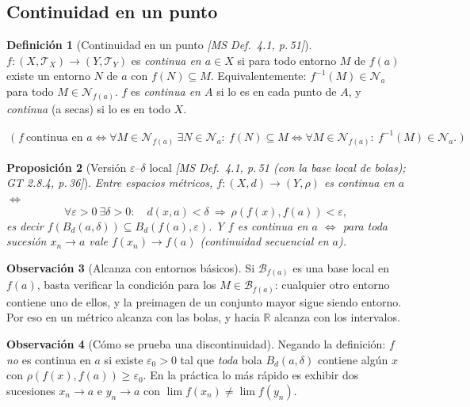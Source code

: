 \documentclass[11pt,a4paper]{article}
\newcommand{\lgc}[1]{\par\vspace{-3pt}\begin{gather*}\big(\;#1\;\big)\end{gather*}\vspace{-6pt}}
\theoremstyle{definition}
\newtheorem{definicion}{Definición}[section]
\newtheorem{observacion}[definicion]{Observación}
\theoremstyle{plain}
\newtheorem{proposicion}[definicion]{Proposición}
\newcommand{\fnt}[1]{{\normalfont\small\itshape\color{gray!150!black}[#1]}}
\newcommand{\R}{\mathbb{R}}
\newcommand{\Bola}[2]{B_d(#1,#2)}
\newcommand{\tp}{\mathcal{T}}
\begin{document}
\subsection{Continuidad en un punto}\label{sec:contpt}

\begin{definicion}[Continuidad en un punto \fnt{MS Def.\ 4.1, p.\,51}]
$f:(X,\tp_X)\to(Y,\tp_Y)$ es \emph{continua en $a\in X$} si para todo entorno $M$ de $f(a)$ existe un entorno $N$ de $a$ con $f(N)\subseteq M$. Equivalentemente: $f^{-1}(M)\in\mathcal N_a$ para todo $M\in\mathcal N_{f(a)}$. $f$ es \emph{continua en $A$} si lo es en cada punto de $A$, y \emph{continua} (a secas) si lo es en todo $X$.
\lgc{f\ \text{continua en } a\iff \forall M\in\mathcal N_{f(a)}\ \exists N\in\mathcal N_a:\ f(N)\subseteq M
\iff \forall M\in\mathcal N_{f(a)}:\ f^{-1}(M)\in\mathcal N_a.}
\end{definicion}

\begin{proposicion}[Versión $\varepsilon$--$\delta$ local \fnt{MS Def.\ 4.1, p.\,51 (con la base local de bolas); GT 2.8.4, p.\,36}]
Entre espacios métricos, $f:(X,d)\to(Y,\rho)$ es continua en $a$ $\iff$
\[
\forall \varepsilon>0\ \exists \delta>0:\quad d(x,a)<\delta \ \Longrightarrow\ \rho(f(x),f(a))<\varepsilon,
\]
es decir $f(\Bola{a}{\delta})\subseteq \Bola{f(a)}{\varepsilon}$. Y $f$ es continua en $a$ $\iff$ para toda sucesión $x_n\to a$ vale $f(x_n)\to f(a)$ (continuidad secuencial \emph{en $a$}).
\end{proposicion}

\begin{observacion}[Alcanza con entornos básicos]
Si $\mathcal B_{f(a)}$ es una base local en $f(a)$, basta verificar la condición para los $M\in\mathcal B_{f(a)}$: cualquier otro entorno contiene uno de ellos, y la preimagen de un conjunto mayor sigue siendo entorno. Por eso en un métrico alcanza con las bolas, y hacia $\R$ alcanza con los intervalos.
\end{observacion}

\begin{observacion}[Cómo se prueba una discontinuidad]
Negando la definición: $f$ \emph{no} es continua en $a$ si existe $\varepsilon_0>0$ tal que \emph{toda} bola $\Bola{a}{\delta}$ contiene algún $x$ con $\rho(f(x),f(a))\ge\varepsilon_0$. En la práctica lo más rápido es exhibir dos sucesiones $x_n\to a$ e $y_n\to a$ con $\lim f(x_n)\ne \lim f(y_n)$.
\end{observacion}
\end{document}
